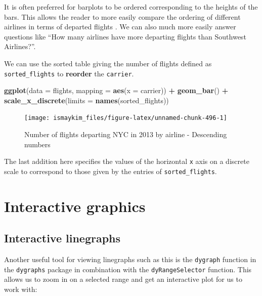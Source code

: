 \documentclass[12pt, krantz2,]{krantz}
\makeatletter
\newenvironment{Shaded}{\begin{snugshade}}{\end{snugshade}}
\newcommand{\DataTypeTok}[1]{\textcolor[rgb]{0.27,0.27,0.27}{#1}}
\newcommand{\KeywordTok}[1]{\textcolor[rgb]{0.27,0.27,0.27}{\textbf{#1}}}
\newcommand{\NormalTok}[1]{#1}
\newcommand{\OperatorTok}[1]{\textcolor[rgb]{0.43,0.43,0.43}{\textbf{#1}}}
\newcommand{\StringTok}[1]{\textcolor[rgb]{0.5,0.5,0.5}{#1}}
\newenvironment{kframe}{%
\medskip{}
\setlength{\fboxsep}{.8em}
 \def\at@end@of@kframe{}%
 \ifinner\ifhmode%
  \def\at@end@of@kframe{\end{minipage}}%
  \begin{minipage}{\columnwidth}%
 \fi\fi%
 \def\FrameCommand##1{\hskip\@totalleftmargin \hskip-\fboxsep
 \colorbox{shadecolor}{##1}\hskip-\fboxsep
     \hskip-\linewidth \hskip-\@totalleftmargin \hskip\columnwidth}%
 \MakeFramed {\advance\hsize-\width
   \@totalleftmargin\z@ \linewidth\hsize
   \@setminipage}}%
 {\par\unskip\endMakeFramed%
 \at@end@of@kframe}
\renewenvironment{Shaded}{\begin{kframe}}{\end{kframe}}
\makeatother
\begin{document}
It is often preferred for barplots to be ordered corresponding to the heights of the bars. This allows the reader to more easily compare the ordering of different airlines in terms of departed flights \citep{robbins2013}. We can also much more easily answer questions like ``How many airlines have more departing flights than Southwest Airlines?''.

We can use the sorted table giving the number of flights defined as \texttt{sorted\_flights} to \textbf{reorder} the \texttt{carrier}.

\begin{Shaded}
\begin{Highlighting}[]
\KeywordTok{ggplot}\NormalTok{(}\DataTypeTok{data =}\NormalTok{ flights, }\DataTypeTok{mapping =} \KeywordTok{aes}\NormalTok{(}\DataTypeTok{x =}\NormalTok{ carrier)) }\OperatorTok{+}
\StringTok{  }\KeywordTok{geom_bar}\NormalTok{() }\OperatorTok{+}
\StringTok{  }\KeywordTok{scale_x_discrete}\NormalTok{(}\DataTypeTok{limits =} \KeywordTok{names}\NormalTok{(sorted_flights))}
\end{Highlighting}
\end{Shaded}

\begin{figure}

{\centering \texttt{[image: ismaykim\_files/figure-latex/unnamed-chunk-496-1]} 

}

\caption{Number of flights departing NYC in 2013 by airline - Descending numbers}\label{fig:unnamed-chunk-496}
\end{figure}

The last addition here specifies the values of the horizontal \texttt{x} axis on a discrete scale to correspond to those given by the entries of \texttt{sorted\_flights}.

\hypertarget{interactive-graphics}{%
\section{Interactive graphics}\label{interactive-graphics}}

\hypertarget{interactive-linegraphs}{%
\subsection{Interactive linegraphs}\label{interactive-linegraphs}}

Another useful tool for viewing linegraphs such as this is the \texttt{dygraph} function in the \texttt{dygraphs} package in combination with the \texttt{dyRangeSelector} function. This allows us to zoom in on a selected range and get an interactive plot for us to work with:
\end{document}
